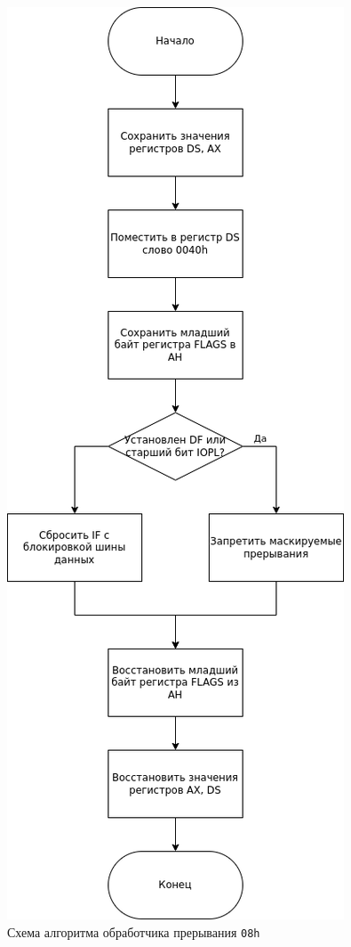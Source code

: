 \documentclass[
]{article}
\begin{document}
\begin{figure}
\centering
\includegraphics{img/fig-02.png}
\caption{Схема алгоритма обработчика прерывания \texttt{08h}}
\end{figure}
\end{document}
